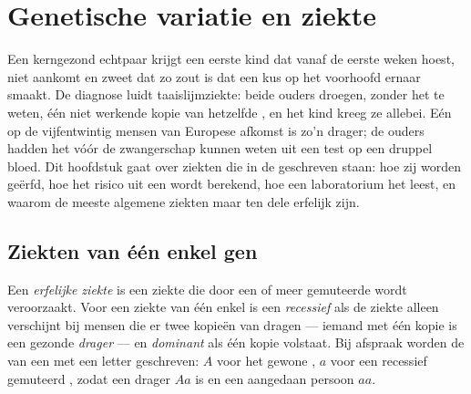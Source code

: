 \chapter{Genetische variatie en ziekte}\label{ch:g11:genes-and-disease}

Een kerngezond echtpaar krijgt een eerste kind dat vanaf de eerste weken
hoest, niet aankomt en zweet dat zo zout is dat een kus op het voorhoofd
ernaar smaakt. De diagnose luidt taaislijmziekte: beide ouders droegen,
zonder het te weten, één niet werkende kopie van hetzelfde , en het
kind kreeg ze allebei. Eén op de vijfentwintig mensen van Europese
afkomst is zo'n drager; de ouders hadden het vóór de zwangerschap kunnen
weten uit een test op een druppel bloed. Dit hoofdstuk gaat over ziekten
die in de  geschreven staan: hoe zij worden geërfd, hoe het risico
uit een  wordt berekend, hoe een laboratorium het  leest, en
waarom de meeste algemene ziekten maar ten dele erfelijk zijn.

\section{Ziekten van één enkel gen}

\begin{definition}\label{def:g11:genes-and-disease:genetic}
Een \emph{erfelijke ziekte} is een ziekte die
door een of meer gemuteerde  wordt veroorzaakt. Voor een ziekte
van één enkel  is een  \emph{recessief} als de
ziekte alleen verschijnt bij mensen die er twee kopieën van dragen ---
iemand met één kopie is een gezonde \emph{drager} --- en
\emph{dominant} als één kopie volstaat. Bij afspraak
worden de  van een  met een letter geschreven: $A$ voor het
gewone , $a$ voor een recessief gemuteerd , zodat een drager
$Aa$ is en een aangedaan persoon $aa$.
\end{definition}

